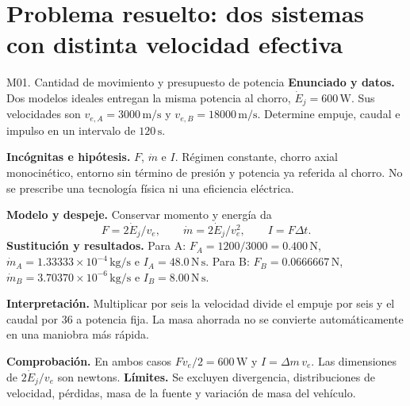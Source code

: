 \section{Problema resuelto: dos sistemas con distinta velocidad efectiva}
\begin{studiumworked}{M01. Cantidad de movimiento y presupuesto de potencia}
\textbf{Enunciado y datos.} Dos modelos ideales entregan la misma potencia al chorro, $\dot E_j=600\,\mathrm W$. Sus velocidades son $v_{e,A}=3000\,\mathrm{m/s}$ y $v_{e,B}=18000\,\mathrm{m/s}$. Determine empuje, caudal e impulso en un intervalo de $120\,\mathrm s$.

\textbf{Incógnitas e hipótesis.} $F$, $\dot m$ e $I$. Régimen constante, chorro axial monocinético, entorno sin término de presión y potencia ya referida al chorro. No se prescribe una tecnología física ni una eficiencia eléctrica.

\textbf{Modelo y despeje.} Conservar momento y energía da
\[F=2\dot E_j/v_e,\qquad \dot m=2\dot E_j/v_e^2,\qquad I=F\Delta t.\]
\textbf{Sustitución y resultados.} Para A: $F_A=1200/3000=0.400\,\mathrm N$, $\dot m_A=1.33333\times10^{-4}\,\mathrm{kg/s}$ e $I_A=48.0\,\mathrm{N\,s}$. Para B: $F_B=0.0666667\,\mathrm N$, $\dot m_B=3.70370\times10^{-6}\,\mathrm{kg/s}$ e $I_B=8.00\,\mathrm{N\,s}$.

\textbf{Interpretación.} Multiplicar por seis la velocidad divide el empuje por seis y el caudal por 36 a potencia fija. La masa ahorrada no se convierte automáticamente en una maniobra más rápida.

\textbf{Comprobación.} En ambos casos $Fv_e/2=600\,\mathrm W$ y $I=\Delta m\,v_e$. Las dimensiones de $2\dot E_j/v_e$ son newtons. \textbf{Límites.} Se excluyen divergencia, distribuciones de velocidad, pérdidas, masa de la fuente y variación de masa del vehículo.

\end{studiumworked}
